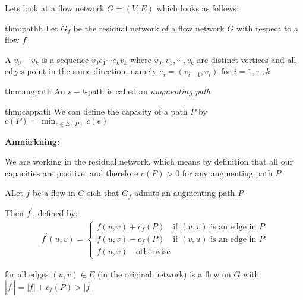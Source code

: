 \noindent Lets look at a flow network $G = (V,E)$ which looks as follows:
\begin{figure}[ht!]
    \centering
    \caption{}
\end{figure}\par
\par\bigskip
\begin{theo}[Path]{thm:pathh}
  Let $G_f$ be the residual network of a flow network $G$ with respect to a flow $f$
  \par\bigskip
  \noindent A $v_0-v_k$ is a sequence $v_0e_1\cdots e_kv_k$ where $v_0,v_1,\cdots,v_k$ are distinct vertices and all edges point in the same direction, namely $e_i = (v_{i-1},v_i)$  for $i = 1,\cdots,k$
  \par\bigskip
\end{theo}
\par\bigskip
\begin{theo}{thm:augpath}
  An $s-t$-path is called an \textit{augmenting path}
\end{theo}
\par\bigskip
\begin{theo}{thm:cappath}
  We can define the capacity of a path $P$ by $c(P) = \min_{e\in E(P)}c(e)$
\end{theo}
\par\bigskip
\noindent\textbf{Anmärkning:}\par
\noindent We are working in the residual network, which means by definition that all our capacities are positive, and therefore $c(P)>0$  for any augmenting path $P$
\par\bigskip
\begin{lem}
  ALet $f$ be a flow in $G$  sich that $G_f$ admits an augmenting path $P$
  \par\bigskip
  \noindent Then $f^{\prime}$, defined by:
  \begin{equation*}
    \begin{gathered}
      f^{\prime}(u,v) = \begin{cases}f(u,v)+c_f(P)\quad\text{if }(u,v)\text{ is an edge in }P\\f(u,v)-c_f(P)\quad\text{if }(v,u)\text{ is an edge in }P\\f(u,v)\quad\text{otherwise}\end{cases}
    \end{gathered}
  \end{equation*}
  \par\bigskip
  \noindent for all edges $(u,v)\in E$ (in the original network) is a flow on $G$ with $\left|f^{\prime}\right| = \left|f\right|+c_f(P)>\left|f\right|$ 
\end{lem}
